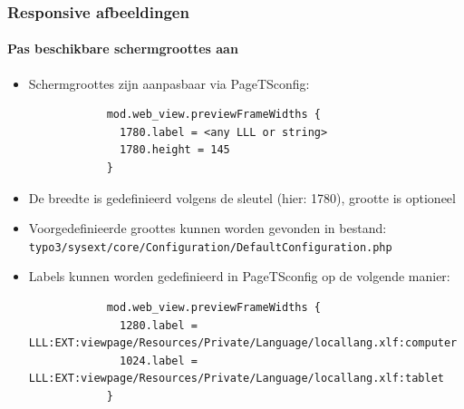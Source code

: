 
\begin{frame}[fragile]
	\frametitle{Responsive afbeeldingen}
	\framesubtitle{Pas beschikbare schermgroottes aan}

	\begin{itemize}
		\item Schermgroottes zijn aanpasbaar via PageTSconfig:


		\begin{lstlisting}
			mod.web_view.previewFrameWidths {
			  1780.label = <any LLL or string>
			  1780.height = 145
			}
		\end{lstlisting}

		\item De breedte is gedefinieerd volgens de sleutel (hier: 1780), grootte is optioneel
		\item Voorgedefinieerde groottes kunnen worden gevonden in bestand:\newline
			\small\texttt{typo3/sysext/core/Configuration/DefaultConfiguration.php}\normalsize
		\item Labels kunnen worden gedefinieerd in PageTSconfig op de volgende manier:

		\begin{lstlisting}
			mod.web_view.previewFrameWidths {
			  1280.label = LLL:EXT:viewpage/Resources/Private/Language/locallang.xlf:computer
			  1024.label = LLL:EXT:viewpage/Resources/Private/Language/locallang.xlf:tablet
			}
		\end{lstlisting}

	\end{itemize}

\end{frame}



